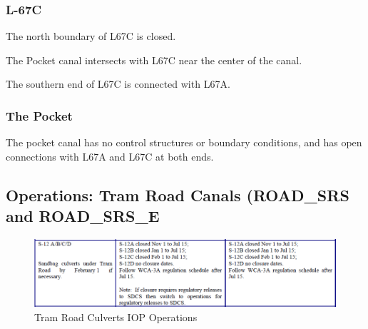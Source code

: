 \clearpage

\subsubsection{L-67C}
The north boundary of L67C is closed.

The Pocket canal intersects with L67C near the center of the canal.

The southern end of L67C is connected with L67A.

\clearpage

\subsubsection{The Pocket}

The pocket canal has no control structures or boundary conditions, and has open connections with L67A and L67C at both ends.


\clearpage

\subsection{Operations: Tram Road Canals (ROAD\_SRS and ROAD\_SRS\_E}
\begin{figure}[!h]
  \begin{center}
  \includegraphics[width=6.5in]{../figs/S12s_IOPops.png}
  \caption{Tram Road Culverts IOP Operations}
  \label{fig:TRCiop}
  \end{center}
\end{figure}

